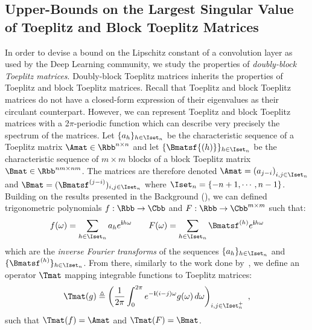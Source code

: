 \subsection{Upper-Bounds on the Largest Singular Value of Toeplitz and Block Toeplitz Matrices}
\label{subsection:ch5-upper_bounds_on_the_largest_singular_value_of_toeplitz_and_block_toeplitz_matrices}

In order to devise a bound on the Lipschitz constant of a convolution layer as used by the Deep Learning community, we study the properties of \emph{doubly-block Toeplitz matrices}. 
Doubly-block Toeplitz matrices inherits the properties of Toeplitz and block Toeplitz matrices.
Recall that Toeplitz and block Toeplitz matrices do not have a closed-form expression of their eigenvalues as their circulant counterpart.
However, we can represent Toeplitz and block Toeplitz matrices with a 2$\pi$-periodic function which can describe very precisely the spectrum of the matrices. 
Let $\{a_h\}_{h \in \Iset_n}$ be the characteristic sequence of a Toeplitz matrix $\Amat \in \Rbb^{n \times n}$ and let $\{\Bmatsf{(h)}\}_{h \in \Iset_n}$ be the characteristic sequence of $m \times m$ blocks of a block Toeplitz matrix $\Bmat \in \Rbb^{nm \times nm}$.
The matrices are therefore denoted $\Amat = \leftmat a_{j-i} \rightmat_{i,j \in \Iset_n}$ and $\Bmat = ( \Bmatsf^{(j-i)} )_{i,j \in \Iset_n}$ where $\Iset_n = \left\{ -n+1, \cdots, n-1 \right\}$.
Building on the results presented in the Background (), we can defined trigonometric polynomials $f: \Rbb \rightarrow \Cbb$ and $F: \Rbb \rightarrow \Cbb^{m \times m}$ such that:
\begin{equation}
  f(\omega) = \sum_{h \in \Iset_n} a_h e^{\ci h \omega} \quad \quad  F(\omega) = \sum_{h \in \Iset_n} \Bmatsf^{(h)} e^{\ci h \omega}
\end{equation}
which are the \emph{inverse Fourier transforms} of the sequences $\{a_h\}_{h \in \Iset_n}$ and $\{\Bmatsf^{(h)}\}_{h \in \Iset_n}$.
From there, similarly to the work done by~\citet{grenander1958toeplitz}, we define an operator $\Tmat$ mapping integrable functions to Toeplitz matrices:
\begin{equation} \label{equation:expression_toeplitz_matrix}
  \Tmat(g) \triangleq\leftmat\frac{1}{2\pi}\int_{0}^{2\pi}e^{-\ci(i-j)\omega}g(\omega)\,d\omega\rightmat_{i,j \in \Iset^+_n} \enspace,
\end{equation}
such that $\Tmat(f) = \Amat$ and $\Tmat(F) = \Bmat$.


